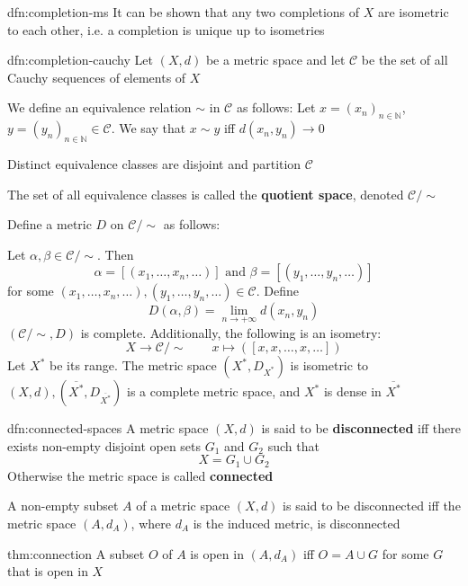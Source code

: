 \documentclass[landscape, 8pt]{extarticle}
\begin{document}
\begin{multicols}{3}
\begin{dfn}{dfn:completion-ms}{}
    It can be shown that any two completions of $X$ are isometric to each other, i.e. a completion is unique up to isometries
\end{dfn}

\newpage

\begin{dfn}{dfn:completion-cauchy}{}
    Let $(X, d)$ be a metric space and let $\mathcal{C}$ be the set of all Cauchy sequences of elements of $X$

    We define an equivalence relation $\sim$ in $\mathcal{C}$ as follows: Let $x = (x_{n})_{n\in \mathbb{N}}$, $y=(y_{n})_{n\in \mathbb{N}}\in \mathcal{C}$. We say that $x \sim y$ iff $d(x_{n}, y_{n})\to 0$

    Distinct equivalence classes are disjoint and partition $\mathcal{C}$

    The set of all equivalence classes is called the \textbf{quotient space}, denoted $\mathcal{C} / \sim$
    
    \longrule{0.08ex}
    Define a metric $D$ on $\mathcal{C} / \sim$ as follows:

    Let $\alpha, \beta\in \mathcal{C} /\sim$. Then 
    \[\alpha = [(x_{1},\dots,x_{n},\dots)] \text{ and } \beta = [(y_{1},\dots,y_{n},\dots)]\]
    for some $(x_{1},\dots,x_{n},\dots), (y_{1},\dots,y_{n},\dots)\in \mathcal{C}$. Define
    \[D(\alpha, \beta) = \lim_{n\to +\infty} d(x_{n}, y_{n})\]
    $(\mathcal{C} / \sim, D)$ is complete. Additionally, the following is an isometry:
    \[X \to \mathcal{C} / \sim \qquad x \mapsto ([x,x,\dots,x,\dots])\]
    Let $X^{*}$ be its range. The metric space $(X^{*}, D_{X^{*}})$ is isometric to $(X, d), (\overline{X^{*}}, D_{\overline{X^{*}}})$ is a complete metric space, and $X^{*}$ is dense in $\overline{X^{*}}$
\end{dfn}

\begin{dfn}{dfn:connected-spaces}{}
    A metric space $(X, d)$ is said to be \textbf{disconnected} iff there exists non-empty disjoint open sets $G_{1}$ and $G_{2}$ such that
    \[X = G_{1} \cup G_{2}\]
    Otherwise the metric space is called \textbf{connected}

    \longrule{0.08ex}
    A non-empty subset $A$ of a metric space $(X, d)$ is said to be disconnected iff the metric space $(A, d_{A})$, where $d_{A}$ is the induced metric, is disconnected
\end{dfn}

\begin{thm}{thm:connection}{}
    A subset $O$ of $A$ is open in $(A, d_{A})$ iff $O = A \cup G$ for some $G$ that is open in $X$ %


\end{thm}
\end{multicols}
\end{document}

